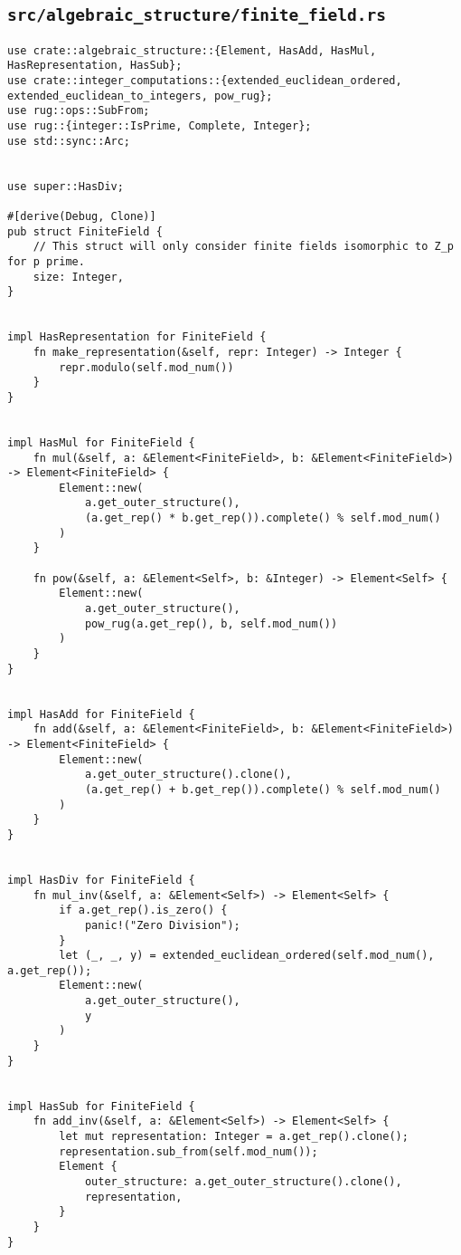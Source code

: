 \subsection{\texttt{src/algebraic_structure/finite_field.rs}}
\begin{verbatim}
use crate::algebraic_structure::{Element, HasAdd, HasMul, HasRepresentation, HasSub};
use crate::integer_computations::{extended_euclidean_ordered, extended_euclidean_to_integers, pow_rug};
use rug::ops::SubFrom;
use rug::{integer::IsPrime, Complete, Integer};
use std::sync::Arc;


use super::HasDiv;

#[derive(Debug, Clone)]
pub struct FiniteField {
    // This struct will only consider finite fields isomorphic to Z_p for p prime.
    size: Integer,
}


impl HasRepresentation for FiniteField {
    fn make_representation(&self, repr: Integer) -> Integer {
        repr.modulo(self.mod_num())
    }
}


impl HasMul for FiniteField {
    fn mul(&self, a: &Element<FiniteField>, b: &Element<FiniteField>) -> Element<FiniteField> {
        Element::new(
            a.get_outer_structure(),
            (a.get_rep() * b.get_rep()).complete() % self.mod_num()
        )
    }

    fn pow(&self, a: &Element<Self>, b: &Integer) -> Element<Self> {
        Element::new(
            a.get_outer_structure(),
            pow_rug(a.get_rep(), b, self.mod_num())
        )
    }
}


impl HasAdd for FiniteField {
    fn add(&self, a: &Element<FiniteField>, b: &Element<FiniteField>) -> Element<FiniteField> {
        Element::new(
            a.get_outer_structure().clone(),
            (a.get_rep() + b.get_rep()).complete() % self.mod_num()
        )
    }
}


impl HasDiv for FiniteField {
    fn mul_inv(&self, a: &Element<Self>) -> Element<Self> {
        if a.get_rep().is_zero() {
            panic!("Zero Division");
        }
        let (_, _, y) = extended_euclidean_ordered(self.mod_num(), a.get_rep());
        Element::new(
            a.get_outer_structure(),
            y
        )
    }
}


impl HasSub for FiniteField {
    fn add_inv(&self, a: &Element<Self>) -> Element<Self> {
        let mut representation: Integer = a.get_rep().clone();
        representation.sub_from(self.mod_num());
        Element {
            outer_structure: a.get_outer_structure().clone(),
            representation,
        }
    }
}



\end{verbatim}
